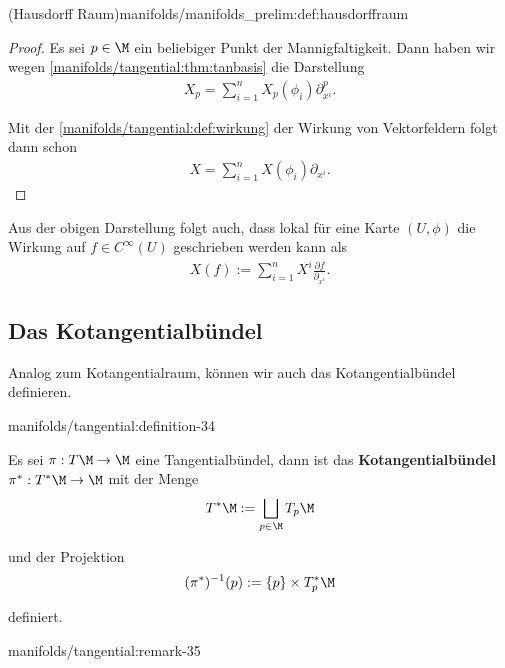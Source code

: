 \documentclass[letterpaper,10pt,english]{jupyterBook}
\begin{document}
\begin{definition}{(Hausdorff Raum)}{manifolds/manifolds_prelim:def:hausdorffraum}
\begin{proof}
 Es sei \(p\in\M\) ein beliebiger Punkt der Mannigfaltigkeit.
Dann haben wir wegen \cref{manifolds/tangential:thm:tanbasis} die Darstellung
\begin{align*}
X_p = \sum_{i=1}^n X_p(\phi_i) \partial_{x^i}^p.
\end{align*}
\par
Mit der \cref{manifolds/tangential:def:wirkung} der Wirkung von Vektorfeldern folgt dann schon
\begin{align*}
X = \sum_{i=1}^n X(\phi_i) \partial_{x^i}.
\end{align*}\end{proof}

\par
Aus der obigen Darstellung folgt auch, dass lokal für eine Karte \((U,\phi)\) die Wirkung auf \(f\in C^\infty(U)\) geschrieben werden kann als
\begin{align*}
X(f) := \sum_{i=1}^n X^i \frac{\partial f}{\partial_{x^i}}.
\end{align*}

\subsection{Das Kotangentialbündel}
\label{\detokenize{manifolds/tangential:das-kotangentialbundel}}\label{\detokenize{manifolds/tangential:s-kotangbundel}}
\par
Analog zum Kotangentialraum, können wir auch das Kotangentialbündel definieren.
\begin{definition}{}{manifolds/tangential:definition-34}



\par
Es sei \(\pi:T\M\to\M\) eine Tangentialbündel, dann ist das \textbf{Kotangentialbündel} \(\pi^\ast: T^\ast\M\to\M\) mit der Menge
\begin{align*}
T^\ast\M := \bigsqcup_{p\in\M} T_p\M
\end{align*}
\par
und der Projektion
\begin{align*}
(\pi^{\ast})^{-1}(p):= \{p\}\times T_p^\ast\M
\end{align*}
\par
definiert.
\end{definition}
\begin{remark}{}{manifolds/tangential:remark-35}




\end{remark}
\end{definition}
\end{document}
